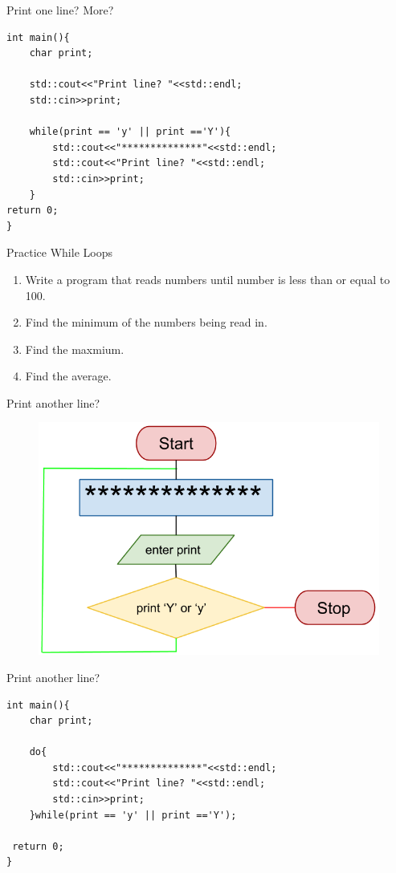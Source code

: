 \documentclass[xcolor={dvipsnames}]{beamer}
\begin{document}
%
\begin{frame}[fragile]{Print one line? More?}
\large
\begin{verbatim}
int main(){
    char print;

    std::cout<<"Print line? "<<std::endl;
    std::cin>>print;

    while(print == 'y' || print =='Y'){
        std::cout<<"**************"<<std::endl;
        std::cout<<"Print line? "<<std::endl;
        std::cin>>print;
    }
return 0;
}
\end{verbatim}
\end{frame}

\begin{frame}{Practice While Loops}
\begin{enumerate}
	\item Write a program that reads numbers until number is less than or equal to 100.
	\item Find the minimum of the numbers being read in. 
	\item Find the maxmium.
	\item Find the average.
\end{enumerate}
\end{frame}

\begin{frame}{Print another line?}
	\begin{figure}
		\includegraphics[width=1\textwidth]{do_while_line}
	\end{figure}
\end{frame}

\begin{frame}[fragile]{Print another line?}
\large
\begin{verbatim}
int main(){
    char print;

    do{     
        std::cout<<"**************"<<std::endl;
        std::cout<<"Print line? "<<std::endl;
        std::cin>>print;
    }while(print == 'y' || print =='Y');

 return 0;
}
\end{verbatim}
\end{frame}
\end{document}
